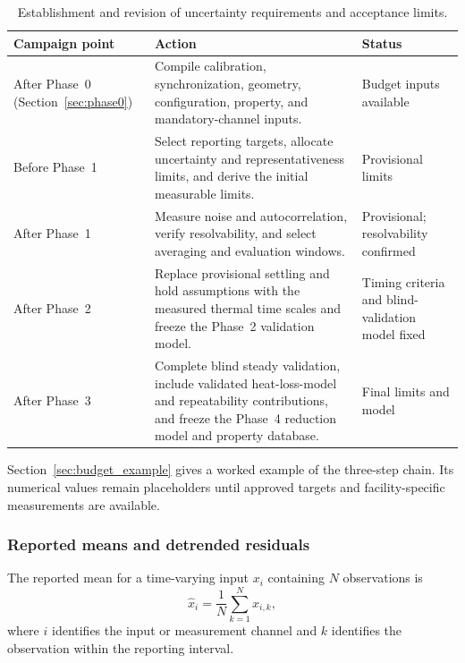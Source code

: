 \documentclass[11pt]{article}
\begin{document}
\begin{table}[H]
    \centering
    \caption{Establishment and revision of uncertainty requirements and acceptance limits.}
    \label{tab:budget_schedule}
    {\small
    \begin{tabularx}{\textwidth}{
        @{}
        >{\raggedright\arraybackslash}p{1.30in}
        >{\raggedright\arraybackslash}X
        >{\raggedright\arraybackslash}p{1.55in}
        @{}
    }
        \toprule
        \textbf{Campaign point} &
        \textbf{Action} &
        \textbf{Status} \\
        \midrule

        After Phase~0 (Section~\ref{sec:phase0}) &
        Compile calibration, synchronization, geometry, configuration, property, and mandatory-channel inputs. &
        Budget inputs available \\

        Before Phase~1 &
        Select reporting targets, allocate uncertainty and representativeness limits, and derive the initial measurable limits. &
        Provisional limits \\

        After Phase~1 &
        Measure noise and autocorrelation, verify resolvability, and select averaging and evaluation windows. &
        Provisional; resolvability confirmed \\

        After Phase~2 &
        Replace provisional settling and hold assumptions with the measured thermal time scales and freeze the Phase~2 validation model. &
        Timing criteria and blind-validation model fixed \\

        After Phase~3 &
        Complete blind steady validation, include validated heat-loss-model and repeatability contributions, and freeze the Phase~4 reduction model and property database. &
        Final limits and model \\

        \bottomrule
    \end{tabularx}}
\end{table}

Section~\ref{sec:budget_example} gives a worked example of the three-step chain. Its numerical values remain placeholders until approved targets and facility-specific measurements are available.

\subsubsection{Reported means and detrended residuals}
The reported mean for a time-varying input $x_i$ containing $N$ observations is
\begin{equation}
    \hat{x}_i
    =
    \frac{1}{N}
    \sum_{k=1}^{N}x_{i,k},
    \label{eq:reported_mean}
\end{equation}
where $i$ identifies the input or measurement channel and $k$ identifies the observation within the reporting interval.
\end{document}
